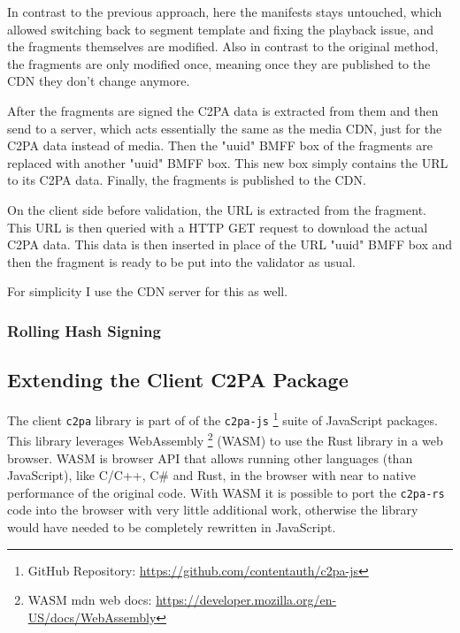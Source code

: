 In contrast to the previous approach, here the manifests stays untouched, which allowed switching back to segment template and fixing the playback issue, and the fragments themselves are modified. Also in contrast to the original method, the fragments are only modified once, meaning once they are published to the CDN they don't change anymore.

After the fragments are signed the C2PA data is extracted from them and then send to a server, which acts essentially the same as the media CDN, just for the C2PA data instead of media. Then the "uuid" BMFF box of the fragments are replaced with another "uuid" BMFF box. This new box simply contains the URL to its C2PA data. Finally, the fragments is published to the CDN.

On the client side before validation, the URL is extracted from the fragment. This URL is then queried with a HTTP GET request to download the actual C2PA data. This data is then inserted in place of the URL "uuid" BMFF box and then the fragment is ready to be put into the validator as usual.

For simplicity I use the CDN server for this as well.

\subsubsection{Rolling Hash Signing\label{sec:rolling_hash_sign}}


\subsection{Extending the Client C2PA Package\label{sec:wasm}}

The client \texttt{c2pa} library is part of of the \texttt{c2pa-js} \footnote{GitHub Repository: \url{https://github.com/contentauth/c2pa-js}} suite of JavaScript packages. This library leverages WebAssembly \footnote{WASM mdn web docs: \url{https://developer.mozilla.org/en-US/docs/WebAssembly}} (WASM) to use the Rust library in a web browser. WASM is browser API that allows running other languages (than JavaScript), like C/C++, C$\#$ and Rust, in the browser with near to native performance of the original code. With WASM it is possible to port the \texttt{c2pa-rs} code into the browser with very little additional work, otherwise the library would have needed to be completely rewritten in JavaScript.

